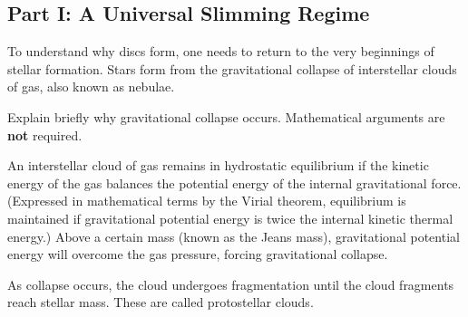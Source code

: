 \documentclass[a4paper,11pt]{exam}
\begin{document}
\subsection*{Part I: A Universal Slimming Regime}
To understand why discs form, one needs to return to the very beginnings of stellar formation. Stars form from the gravitational collapse of interstellar clouds of gas, also known as nebulae.
\begin{questions}
\question[2]
	Explain briefly why gravitational collapse occurs. Mathematical arguments are \textbf{not} required.
	\droppoints
	\begin{solution}
		An interstellar cloud of gas remains in hydrostatic equilibrium if the kinetic energy of the gas balances the potential energy of the internal gravitational force. (Expressed in mathematical terms by the Virial theorem, equilibrium is maintained if gravitational potential energy is twice the internal kinetic thermal energy.) Above a certain mass (known as the Jeans mass), gravitational potential energy will overcome the gas pressure, forcing gravitational collapse. 
	\end{solution}
	
\question
	As collapse occurs, the cloud undergoes fragmentation until the cloud fragments reach stellar mass. These are called protostellar clouds.


\end{questions}
\end{document}

